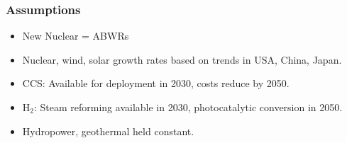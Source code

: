 \begin{frame}
  \frametitle{Assumptions}

  \begin{itemize}
  
  \item New Nuclear = ABWRs
  
  \item Nuclear, wind, solar growth rates based on trends in USA, China, Japan.
  
  \item CCS: Available for deployment in 2030, costs reduce by 2050.
  
  \item H$_2$: Steam reforming available in 2030, photocatalytic conversion in 2050.
  
  \item Hydropower, geothermal held constant.
  
  \end{itemize}

\end{frame}
